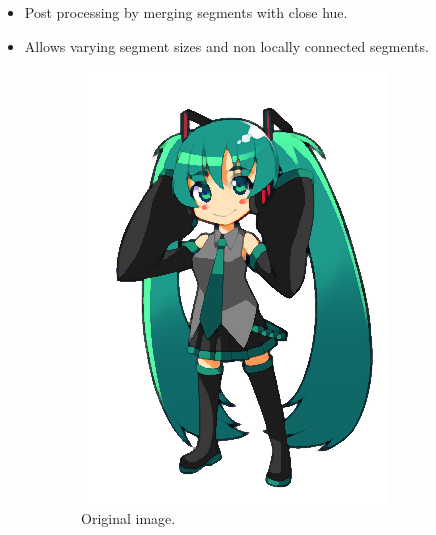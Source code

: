 \documentclass{beamer}
\begin{document}
\begin{frame}
\begin{itemize}
\item Post processing by merging segments with close hue.
\item Allows varying segment sizes and non locally connected segments.
\end{itemize}

\begin{figure}[htb!]
\centering
\begin{subfigure}{0.3\textwidth}
\includegraphics[width=\textwidth]{../images/miku_a.png}
\caption{Original image.}
\end{subfigure}
\begin{subfigure}{0.3\textwidth}

\end{subfigure}
\end{figure}
\end{frame}
\end{document}
